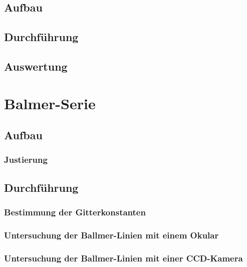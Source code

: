 \subsection{Aufbau}

\subsection{Durchführung}

\subsection{Auswertung}


\section{Balmer-Serie}

\subsection{Aufbau}

\subsubsection{Justierung}

\subsection{Durchführung}

\subsubsection{Bestimmung der Gitterkonstanten}

\subsubsection{Untersuchung der Ballmer-Linien mit einem Okular}

\subsubsection{Untersuchung der Ballmer-Linien mit einer CCD-Kamera}

